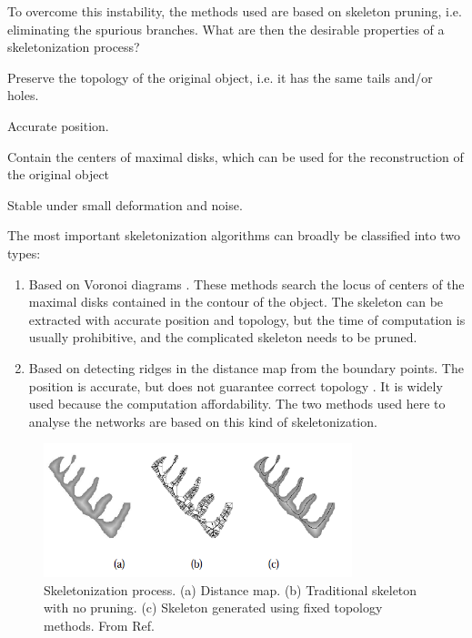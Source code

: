 To overcome this instability, the methods used are based on skeleton pruning,
i.e. eliminating the spurious branches. What are then the desirable properties
of a skeletonization process?
\begin{enumerate*}[label=\textbf{\alph*)}]
  \item Preserve the topology of the original object, i.e. it has the same tails
  and/or holes.
  \item Accurate position.
  \item Contain the centers of maximal disks, which can be used for the
  reconstruction of the original object
  \item Stable under small deformation and noise. 
  
\end{enumerate*}

The most important skeletonization algorithms
can broadly be classified into two types:

\begin{enumerate}

  \item Based on Voronoi diagrams \citep{ogniewicz_hierarchic_1995}. 
These methods search the locus of centers of the maximal disks
contained in the contour of the object. The skeleton can be
extracted with accurate position and topology, but the time
of computation is usually prohibitive, and the complicated skeleton needs to be
pruned.
  \item Based on detecting ridges
  in the distance map from the boundary points. The
  position is accurate, but does not guarantee correct topology
  \citep{ge_generation_1996}. It is widely used because the computation
  affordability. The two methods used here to analyse the networks are based on
  this kind of skeletonization. 
\end{enumerate}
 

\begin{figure}[h]
\begin{center}
\includegraphics[width=0.8\textwidth]{Figures/chapter-image/skeleton-fixedtopo_letters.png}%
\caption[Skeletonization]{Skeletonization process. (a) Distance
map. (b) Traditional skeleton with no pruning. (c) Skeleton generated using
fixed topology methods. From Ref.\citep{bai_skeleton_2007,golland_fixed_2000}}
\label{fig:skeleton-fixedtopo} 
\end{center}
\end{figure}
 
